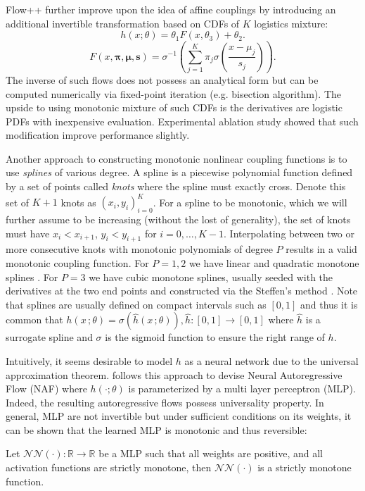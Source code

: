Flow++ \cite{hoFlowImprovingFlowBased2019} further improve upon the idea of
affine couplings by introducing an additional invertible transformation based on
CDFs of $K$ logistics mixture:
$$
h(x;\theta) = \theta_1 F(x, \theta_3) + \theta_2
.$$
$$
F(x,\bm{\pi}, \bm{\mu}, \mathbf{s}) = \sigma^{-1}\left(\sum_{j=1}^{K}\pi_j\sigma \left(\frac{x-\mu_j}{s_j}\right)\right)
.$$
The inverse of such flows does not possess an analytical form but can be
computed numerically via fixed-point iteration (e.g. bisection algorithm). The
upside to using monotonic mixture of such CDFs is the derivatives are logistic
PDFs with inexpensive evaluation. Experimental ablation study showed that such
modification improve performance slightly.

Another approach to constructing monotonic nonlinear coupling functions is to
use \textit{splines} of various degree. A spline is a piecewise polynomial
function defined by a set of points called \textit{knots} where the spline must
exactly cross. Denote this set of $K+1$ knots as $(x_i, y_i)_{i=0}^K$. For a
spline to be monotonic, which we will further assume to be increasing (without
the lost of generality), the set of knots must have $x_i < x_{i+1}$, $y_i <
y_{i+1}$ for $i=0,\ldots,K-1$. Interpolating between two or more consecutive
knots with monotonic polynomials of degree $P$ results in a valid monotonic
coupling function. For $P=1,2$ we have linear and quadratic monotone splines
\cite{mullerNeuralImportanceSampling2019}. For $P=3$ we have cubic monotone
splines, usually seeded with the derivatives at the two end points and
constructed via the Steffen's method \cite{durkanCubicSplineFlows2019}. Note
that splines are usually defined on compact intervals such as $[0,1]$ and thus
it is common that $h(x\,;\theta) = \sigma(\hat{h}(x\,;\theta)), \hat{h}: [0,1]
\to [0,1]$ where $\hat{h}$ is a surrogate spline and $\sigma$ is the sigmoid
function to ensure the right range of $h$.

Intuitively, it seems desirable to model $h$ as a neural network due to the
universal approximation theorem. \cite{huangNeuralAutoregressiveFlows2018}
follows this approach to devise Neural Autoregressive Flow (NAF) where $h(\cdot;
\theta)$ is parameterized by a multi layer perceptron (MLP). Indeed, the
resulting autoregressive flows possess universality property. In general, MLP
are not invertible but under sufficient conditions on its weights, it can be
shown that the learned MLP is monotonic and thus reversible:

\begin{theorem}
  Let $\mathcal{NN}(\cdot): \mathbb{R} \to \mathbb{R}$ be a MLP such that all weights are
  positive, and all activation functions are strictly monotone, then
  $\mathcal{NN}(\cdot)$
  is a strictly monotone function.
\end{theorem}

